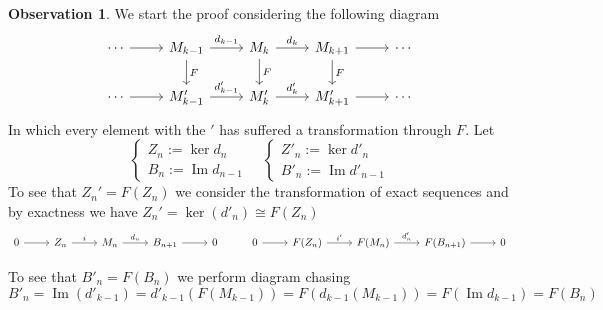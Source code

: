 \documentclass[leqno]{article}
\theoremstyle{definition}
\newtheorem{observation}{Observation}[section]
\DeclareMathOperator{\im}{Im}
\begin{document}
\begin{observation}
We start the proof considering the following diagram
\[\begin{tikzcd}
	\cdots & {M_{k-1}} & {M_{k}} & {M_{k+1}} & \cdots \\
	\cdots & {M'_{k-1}} & {M'_{k}} & {M'_{k+1}} & \cdots
	\arrow[from=1-1, to=1-2]
	\arrow[from=2-1, to=2-2]
	\arrow["F", from=1-2, to=2-2]
	\arrow["F", from=1-3, to=2-3]
	\arrow["F", from=1-4, to=2-4]
	\arrow["{d_{k-1}}", from=1-2, to=1-3]
	\arrow["{d_k}", from=1-3, to=1-4]
	\arrow["{d'_k}", from=2-3, to=2-4]
	\arrow["{d'_{k-1}}", from=2-2, to=2-3]
	\arrow[from=1-4, to=1-5]
	\arrow[from=2-4, to=2-5]
\end{tikzcd}\]
In which every element with the $'$ has suffered a transformation through $F$. Let
\[
\begin{cases}
  Z_n := \ker d_n\\
  B_n := \im d_{n-1}
\end{cases} \quad
\begin{cases}
  Z'_n := \ker d'_n\\
  B'_n := \im d'_{n-1}
\end{cases}
\] 
To see that $Z_n' = F(Z_n)$ we consider the transformation of exact sequences
and by exactness we have  $Z_n'=\ker (d'_n)\cong F(Z_n)$
\[\begin{tikzcd}
	0 & {Z_n} & {M_n} & {B_{n+1}} & 0 & 0 & {F(Z_n)} & {F(M_n)} & {F(B_{n+1})} & 0
	\arrow[from=1-6, to=1-7]
	\arrow["{i'}", from=1-7, to=1-8]
	\arrow["{d'_n}", from=1-8, to=1-9]
	\arrow[from=1-1, to=1-2]
	\arrow["i", from=1-2, to=1-3]
	\arrow["{d_n}", from=1-3, to=1-4]
	\arrow[from=1-4, to=1-5]
	\arrow[from=1-9, to=1-10]
\end{tikzcd}\]

To see that $B'_n = F(B_n)$ we perform diagram chasing
 \[
   B'_n = \im (d'_{k-1}) = d'_{k-1}(F(M_{k-1})) = F(d_{k-1}(M_{k-1})) = F(\im d_{k-1}) = F(B_n)
\] 


\end{observation}
\end{document}
